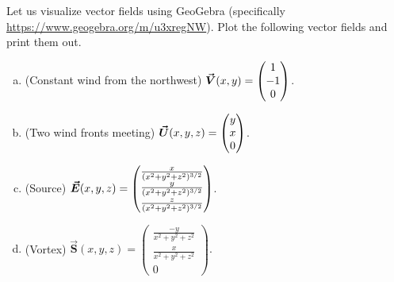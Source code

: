 \documentclass[12pt]{article} %
\begin{document}
\newpage
\begin{problem} 
Let us visualize vector fields using GeoGebra (specifically \url{https://www.geogebra.org/m/u3xregNW}). Plot the following vector fields and print them out. 
\begin{enumerate}[(a)]
    \item (Constant wind from the northwest) $\boldsymbol{\vec{V}}(x,y)=\begin{pmatrix} 1 \\ -1 \\ 0\end{pmatrix}$.
        \item (Two wind fronts meeting) $\boldsymbol{\vec{U}}(x,y,z)=\begin{pmatrix} y \\ x \\ 0 \end{pmatrix}$.
                        \item (Source) $\boldsymbol{\vec{E}}(x,y,z) = \begin{pmatrix} \frac{x}{(x^2+y^2+z^2)^{3/2}} \\ \frac{y}{(x^2+y^2+z^2)^{3/2}} \\ \frac{z}{(x^2+y^2+z^2)^{3/2}} \end{pmatrix}$.
                  \item (Vortex) $\boldsymbol{\vec{S}}(x,y,z)=\begin{pmatrix} \frac{-y}{x^2+y^2+z^2} \\ \frac{x}{x^2+y^2+z^2} \\ 0\end{pmatrix}.$           
\end{enumerate}
\end{problem}
\end{document}
